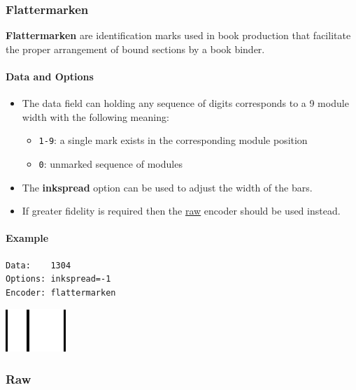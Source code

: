 \hypertarget{flattermarken}{%
\subsubsection{Flattermarken}\label{flattermarken}}

\textbf{Flattermarken} are identification marks used in book production
that facilitate the proper arrangement of bound sections by a book
binder.

\hypertarget{data-and-options-81}{%
\paragraph{Data and Options}\label{data-and-options-81}}

\begin{itemize}
\tightlist
\item
  The data field can holding any sequence of digits corresponds to a 9
  module width with the following meaning:

  \begin{itemize}
  \tightlist
  \item
    \texttt{1-9}: a single mark exists in the corresponding module
    position
  \item
    \texttt{0}: unmarked sequence of modules
  \end{itemize}
\item
  The \textbf{inkspread} option can be used to adjust the width of the
  bars.
\item
  If greater fidelity is required then the \protect\hyperlink{raw}{raw}
  encoder should be used instead.
\end{itemize}

\hypertarget{example-21}{%
\paragraph{Example}\label{example-21}}

\begin{verbatim}
Data:    1304
Options: inkspread=-1
Encoder: flattermarken
\end{verbatim}

\includegraphics{images/flattermarken-1.eps}

\hypertarget{raw}{%
\subsubsection{Raw}\label{raw}}


